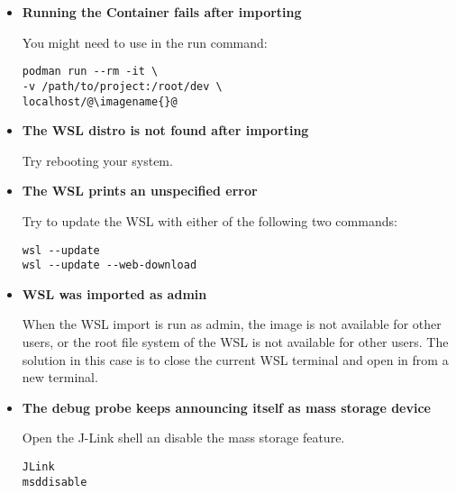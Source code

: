 \begin{itemize}
  \item {\bf Running the Container fails after importing}

    You might need to use  in the run command:
  \begin{lstlisting}
podman run --rm -it \
-v /path/to/project:/root/dev \
localhost/@\imagename{}@
\end{lstlisting}
  \item {\bf The WSL distro is not found after importing}

    Try rebooting your system.
  \item {\bf The WSL prints an unspecified error}

    Try to update the WSL with either of the following two commands:
  \begin{lstlisting}
wsl --update
wsl --update --web-download
\end{lstlisting}
  \item \textbf{WSL was imported as admin}

    When the WSL import is run as admin, the image is not available for other users, or the root file system of the WSL is not available for other users.
    The solution in this case is to close the current WSL terminal and open in from a new terminal.
  \item {\bf The debug probe keeps announcing itself as mass storage device}

    Open the J-Link shell an disable the mass storage feature.
  \begin{lstlisting}
JLink
msddisable
\end{lstlisting}
\end{itemize}
